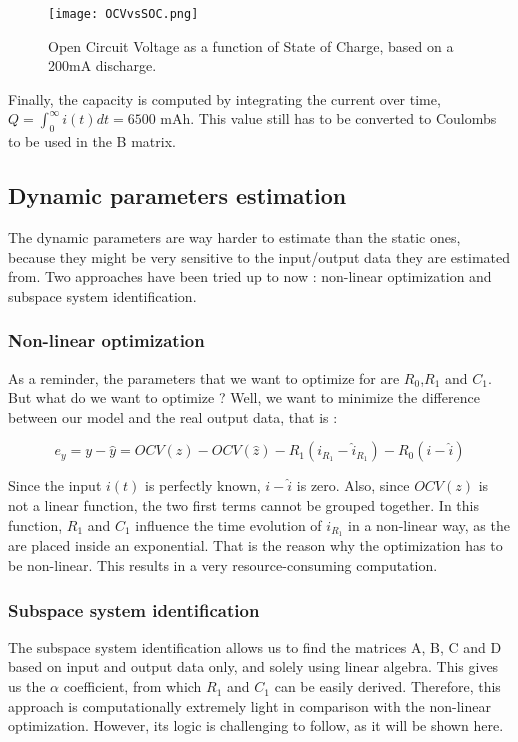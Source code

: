 \documentclass{article}
\begin{document}
\begin{figure}[h]
\centering
\texttt{[image: OCVvsSOC.png]}
\caption{Open Circuit Voltage as a function of State of Charge, based on a 200mA discharge.}
\label{fig:OCVvsSOC}
\end{figure}


Finally, the capacity is computed by integrating the current over time, $Q = \int_0^\infty i(t) dt = 6500$ mAh. This value still has to be converted to Coulombs to be used in the B matrix. 
 
\subsection{Dynamic parameters estimation}

The dynamic parameters are way harder to estimate than the static ones, because they might be very sensitive to the input/output data they are estimated from. Two approaches have been tried up to now : non-linear optimization and subspace system identification. 

\subsubsection{Non-linear optimization}

As a reminder, the parameters that we want to optimize for are $R_0$,$R_1$ and $C_1$. But what do we want to optimize ? Well, we want to minimize the difference between our model and the real output data, that is : 

\begin{equation}
e_y = y - \hat{y} = OCV(z) -OCV(\hat{z}) - R_1( i_{R_1} - \hat{i}_{R_1}) - R_0(i - \hat{i})
\end{equation}

Since the input $i(t)$ is perfectly known, $i-\hat{i}$ is zero. Also, since $OCV(z)$ is not a linear function, the two first terms cannot be grouped together. In this function, $R_1$ and $C_1$ influence the time evolution of $i_{R_1}$ in a non-linear way, as the are placed inside an exponential. That is the reason why the optimization has to be non-linear. This results
in a very resource-consuming computation.

\subsubsection{Subspace system identification}

The subspace system identification allows us to find the matrices A, B, C and D based on input and output data only, and solely using linear algebra. This gives us the $\alpha$ coefficient, from which $R_1$ and $C_1$ can be easily derived. Therefore, this approach is computationally extremely light in comparison with the non-linear optimization. However, its logic is challenging to follow, as it will be shown here.
\end{document}
